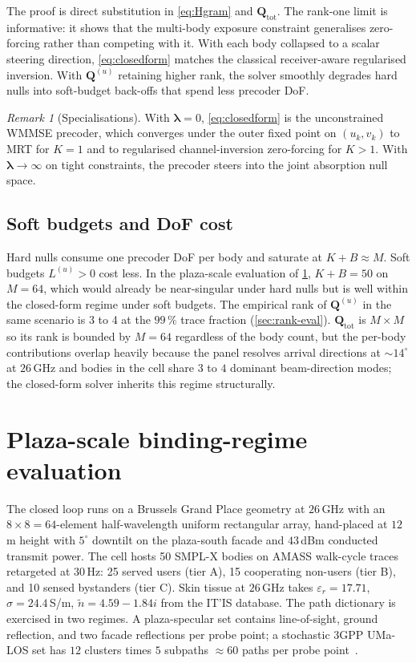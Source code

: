 \documentclass[journal,twocolumn,10pt]{IEEEtran}
\theoremstyle{plain}
\theoremstyle{remark}
\newtheorem{remark}[theorem]{Remark}
\newcommand{\Qmat}{\mathbf{Q}}
\newcommand{\ntilde}{\tilde{n}}
\begin{document}
The proof is direct substitution in \cref{eq:Hgram} and
$\Qmat_{\mathrm{tot}}$. The rank-one limit is informative: it shows
that the multi-body exposure constraint generalises zero-forcing
rather than competing with it. With each body collapsed to a scalar
steering direction, \cref{eq:closedform} matches the classical
receiver-aware regularised inversion. With $\Qmat^{(u)}$ retaining
higher rank, the solver smoothly degrades hard nulls into
soft-budget back-offs that spend less precoder DoF.

\begin{remark}[Specialisations]\label{rem:limits}
With $\bm\lambda = 0$, \cref{eq:closedform} is the unconstrained
WMMSE precoder, which converges under the outer fixed point on
$(u_k, v_k)$ to MRT for $K = 1$ and to regularised channel-inversion
zero-forcing for $K > 1$. With $\bm\lambda \to \infty$ on tight
constraints, the precoder steers into the joint absorption null
space.
\end{remark}

\subsection{Soft budgets and DoF cost}\label{sec:softbudget}

Hard nulls consume one precoder DoF per body and saturate at
$K + B \approx M$. Soft budgets $L^{(u)} > 0$ cost less. In the
plaza-scale evaluation of \cref{sec:eval}, $K + B = 50$ on $M = 64$,
which would already be near-singular under hard nulls but is well
within the closed-form regime under soft budgets. The empirical rank
of $\Qmat^{(u)}$ in the same scenario is 3 to 4 at the $99\,\%$
trace fraction (\cref{sec:rank-eval}). $\Qmat_{\mathrm{tot}}$ is
$M\times M$ so its rank is bounded by $M = 64$ regardless of the
body count, but the per-body contributions overlap heavily because
the panel resolves arrival directions at $\sim 14^\circ$ at
$26\,$GHz and bodies in the cell share $3$ to $4$ dominant
beam-direction modes; the closed-form solver inherits this regime
structurally.


\section{Plaza-scale binding-regime evaluation}\label{sec:eval}

The closed loop runs on a Brussels Grand Place geometry at $26\,$GHz
with an $8 \times 8 = 64$-element half-wavelength uniform rectangular
array, hand-placed at $12\,$m height with $5^\circ$ downtilt on the
plaza-south facade and $43\,$dBm conducted transmit power. The cell
hosts 50 SMPL-X bodies on AMASS walk-cycle traces retargeted at
$30\,$Hz: 25 served users (tier A), 15 cooperating non-users
(tier B), and 10 sensed bystanders (tier C). Skin tissue at
$26\,$GHz takes
$\varepsilon_r = 17.71$, $\sigma = 24.4\,$S/m,
$\ntilde = 4.59 - 1.84i$ from the IT'IS database. The path
dictionary is exercised in two regimes. A plaza-specular set
contains line-of-sight, ground reflection, and two facade reflections
per probe point; a stochastic 3GPP UMa-LOS set has $12$ clusters
times $5$ subpaths $\approx 60$ paths per probe
point~\cite{TR38901}.
\end{document}
